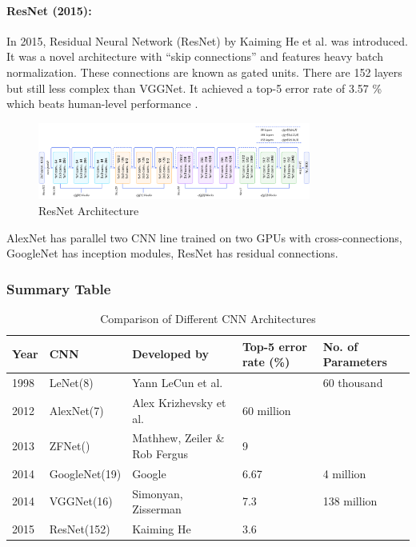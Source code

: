 \paragraph*{ResNet (2015):}
In 2015, Residual Neural Network (ResNet) by Kaiming He et al. was introduced. It was a novel architecture with “skip connections” and features heavy batch normalization. These connections are known as gated units. There are 152 layers but still less complex than VGGNet. It achieved a top-5 
error rate of 3.57 \% which beats human-level performance \cite{chap_2_article:14}. 

\begin{figure}[H]
	\centering
	\captionsetup{justification=centering,margin=2cm}
	\includegraphics[width = 0.8\textwidth]{CHAPTERS/Chapter-2/Images/2.12.png}
	\caption{ResNet Architecture}
	\label{fig:2.11}
\end{figure}

AlexNet has parallel two CNN line trained on two GPUs with cross-connections, GoogleNet has 
inception modules, ResNet has residual connections.

\subsubsection*{Summary Table}
\begin{table}[H]
	\caption{Comparison of Different CNN Architectures}
	  \begin{center}
		\scalebox{.85}
		{\begin{tabular}{|l |l |l |l |l |}
		\hline
		Year & CNN & Developed by & Top-5 error rate (\%) & No. of Parameters \\ \hline
		1998  & LeNet(8) & Yann LeCun et al. &  &  60 thousand 
		\\ \hline
		2012  & AlexNet(7) & Alex Krizhevsky et al. & 60 million &
		\\ \hline
		2013   & ZFNet() &  Mathhew, Zeiler \& Rob Fergus & 9 &
		\\ \hline %
		2014 & GoogleNet(19) & Google & 6.67  & 4 million
		\\ \hline
		2014 & VGGNet(16) & Simonyan, Zisserman & 7.3 & 138 million
		\\ \hline
		2015 & ResNet(152)& Kaiming He & 3.6 & 
		\\ \hline   
		\end{tabular}}
	  \end{center}
\end{table}


